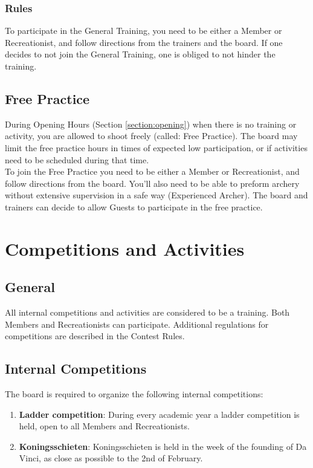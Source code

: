 \documentclass[a4paper]{article}
\newcommand{\Awr}{Contest Rules} %
\begin{document}
\subsubsection{Rules}
To participate in the General Training, you need to be either a Member or Recreationist, and follow directions from the trainers and the board. If one decides to not join the General Training, one is obliged to not hinder the training. 

\subsection{Free Practice}
During Opening Hours (Section \ref{section:opening}) when there is no training or activity, you are allowed to shoot freely (called: Free Practice). The board may limit the free practice hours in times of expected low participation, or if activities need to be scheduled during that time. \\

To join the Free Practice you need to be either a Member or Recreationist, and follow directions from the board. You'll also need to be able to preform archery without extensive supervision in a safe way (Experienced Archer). The board and trainers can decide to allow Guests to participate in the free practice.

\section{Competitions and Activities}
\subsection{General}
All internal competitions and activities are considered to be a training. Both Members and Recreationists can participate. Additional regulations for competitions are described in the \Awr .

\subsection{Internal Competitions}
The board is required to organize the following internal competitions: \\
\begin{enumerate}
\item \textbf{Ladder competition}: During every academic year a ladder competition is held, open to all Members and Recreationists.
\item \textbf{Koningsschieten}: Koningsschieten is held in the week of the founding of Da Vinci, as close as possible to the 2nd of February.
\end{enumerate}
\end{document}
